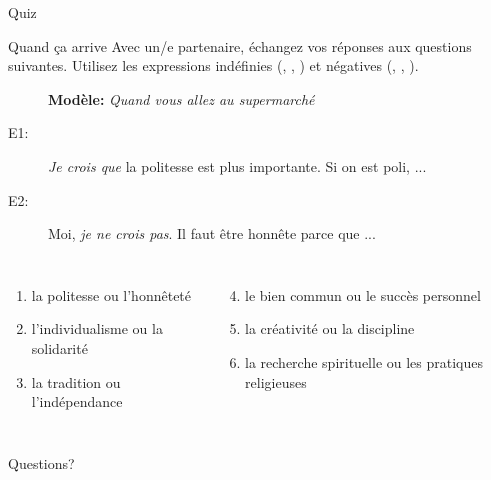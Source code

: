 \documentclass{beamer}
\begin{document}
  \begin{frame}{}
    \begin{center}
      \Large Quiz
    \end{center}
  \end{frame}

  \begin{frame}{Quand ça arrive}
    Avec un/e partenaire, échangez vos réponses aux questions suivantes.
    Utilisez les expressions indéfinies (, , ) et négatives (, , ).
    \begin{description}
      \item[] \textbf{Modèle:} \emph{Quand vous allez au supermarché}
      \item[E1:] \emph{Je crois que} la politesse est plus importante. Si on est poli, ...
      \item[E2:] Moi, \emph{je ne crois pas}. Il faut être honnête parce que ...
    \end{description}
    \begin{columns}[t]
        \begin{enumerate}
          \item la politesse ou l'honnêteté
          \item l'individualisme ou la solidarité
          \item la tradition ou l'indépendance
        \end{enumerate}
        \begin{enumerate}
          \setcounter{enumi}{3}
          \item le bien commun ou le succès personnel
          \item la créativité ou la discipline
          \item la recherche spirituelle ou les pratiques religieuses
        \end{enumerate}
    \end{columns}
  \end{frame}

  \begin{frame}{}
    \begin{center}
      \Large Questions?
    \end{center}
  \end{frame}
\end{document}

